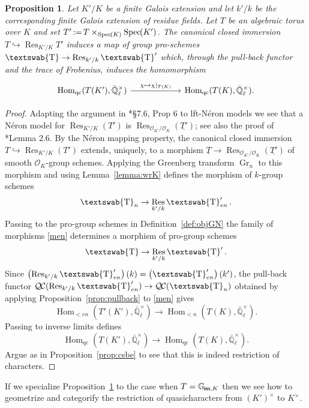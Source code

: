 \documentclass[11pt]{amsart}
\newcommand{\mathswab}[1]{\operatorname{\textswab{#1}}}
\theoremstyle{plain}
\newtheorem{proposition}[theorem]{Proposition}
\theoremstyle{definition}
\theoremstyle{remark}
\newcommand{\Spec}[1]{{\operatorname{Spec}\hskip-1pt( #1 )}}
\newcommand{\EE}{\mathbb{\bar Q}_\ell}
\newcommand{\OK}{\mathcal{O}_K}
\newcommand{\Fq}{k}
\newcommand{\EEx}{\EE^\times}
\DeclareMathOperator{\Hom}{Hom}
\DeclareMathOperator{\Gr}{Gr}
\DeclareMathOperator{\Res}{Res}
\newcommand{\ceq}{{\, :=\, }}
\newcommand{\Gm}[1]{\mathbb{G}_{\hskip-1pt\textbf{m},#1}}
\newcommand{\GN}[1]{\mathswab{#1}}
\newcommand{\QC}{{\mathcal{Q\hskip-0.8pt C}}}
\begin{document}
\begin{proposition}\label{prop:wrK}
Let $K'/K$ be a finite Galois extension and
let $k'/k$ be the corresponding finite Galois extension of residue fields.
Let $T$ be an algebraic torus over $K$ and 
set $T' \ceq T \times_\Spec{K} \Spec{K'}$.
The canonical closed immersion $T \hookrightarrow \Res_{K'/K} T'$
induces a map of group pro-schemes $\GN{T} \to \Res_{k'/k} \GN{T}'$ which,
through the pull-back functor and the trace of Frobenius, induces the homomorphism
\[
\begin{tikzcd}[column sep=60]
\Hom_{\text{qc}}(T(K'), \EEx) \arrow{r}{\chi \mapsto \chi\vert_{T(K)}} &\Hom_{\text{qc}}(T(K), \EEx).
\end{tikzcd}
\]  
\end{proposition}

\begin{proof}
Adapting the argument in \cite{bosch-lutkebohmert-reynaud:NeronModels}*{\S 7.6, Prop 6} to lft-Néron models
we see that a Néron model for $\Res_{K'/K}(T')$ is $\Res_{\mathcal{O}_{K'}/\OK}(\underline{T'})$;
see also the proof of \cite{xarles:93a}*{Lemma 2.6}.
By the Néron mapping property, the canonical closed immersion
$T\hookrightarrow \Res_{K'/K}(T')$ extends, uniquely, to a morphism
$\underline{T}\to \Res_{\mathcal{O}_{K'}/\OK}(\underline{T'})$ of smooth $\OK$-group schemes.
Applying the Greenberg transform $\Gr_{n}$ to this morphism
and using Lemma~\ref{lemma:wrK} defines the morphism of $\Fq$-group schemes
\begin{equation}\label{men}
\GN{T}_n \to \Res_{k'/k} \GN{T}'_{en}.
\end{equation}
Passing to the pro-group schemes in Definition~\ref{def:objGN} 
the family of morphisms \eqref{men} determines a morphism of pro-group schemes
\[
\GN{T} \to \Res_{k'/k} \GN{T}'.
\]
Since $\left(\Res_{k'/k} \GN{T}'_{en} \right)(\Fq) = \left(\GN{T}'_{en}\right)(k')$,
the pull-back functor $\QC(\Res_{k'/k} \GN{T}'_{en})\to \QC(\GN{T}_n)$
obtained by applying Proposition~\ref{prop:pullback} to \eqref{men} gives
\[
\Hom_{< en}(T'(K'),\EEx) \to \Hom_{< n}(T(K),\EEx).
\]
Passing to inverse limits defines
\[
\Hom_{\text{qc}}(T(K'),\EEx) \to \Hom_{\text{qc}}(T(K),\EEx).
\]
Argue as in Proposition~\ref{prop:csbe} to see that this is indeed restriction of characters.
\end{proof}

If we specialize Proposition~\ref{prop:wrK} to the case when 
$T = \Gm{K}$ then we see how to geometrize and categorify the restriction of quasicharacters from $(K')^\times$ to $K^\times$.
\end{document}
